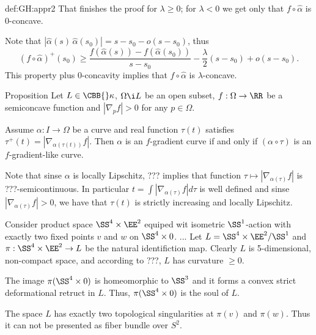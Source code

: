 {\begin{subthm}{def:GH:appr2}
That finishes the proof for $\lambda\ge 0$; for $\lambda<0$ we get only that $f\circ\hat\alpha$ is $0$-concave.

Note that $|\hat\alpha(s)\,\hat\alpha(s_0)|=s-s_0-o(s-s_0)$, thus
$$(f\circ\hat\alpha)^+(s_0)\ge
\frac{f(\hat\alpha(s))-f(\hat\alpha(s_0))}{s-s_0} -\frac\lambda2(s-s_0)+o(s-s_0).$$
This property plus $0$-concavity implies that $f\circ\hat\alpha$ is  $\lambda$-concave.\qeds  

\begin{thm}{Proposition}
Let $L\in\CBB{}\kappa$,
$\Omega\i L$ be an open subset,
$f:\Omega\to\RR$ be a semiconcave function 
and $|\nabla_p f|>0$ for any $p\in\Omega$.

Assume $\alpha:I\to\Omega$ be a curve and real function $\tau(t)$ satisfies $\tau^+(t)=|\nabla_{\alpha(\tau(t))} f|$.
Then $\alpha$ is an $f$-gradient curve
if and only if 
$(\alpha\circ\tau)$ is an $f$-gradient-like curve.
\end{thm}

Note that sinse $\alpha$ is locally Lipschitz, ??? implies that function $\tau\mapsto |\nabla_{\alpha(\tau)} f|$ is ???-semicontinuous.
In particular $t=\int|\nabla_{\alpha(\tau)} f|d\tau$ is well defined and sinse $|\nabla_{\alpha(\tau)} f|>0$, we have that $\tau(t)$ is strictly increasing and locally Lipschitz.
\qeds





















Consider product space $\SS^4\times \EE^2$ equiped wit isometric $\SS^1$-action with exactly two fixed points $v$ and $w$ on $\SS^4\times 0$.
...
Let $L=\SS^4\times \EE^2/\SS^1$ and $\pi:\SS^4\times \EE^2\to L$ be the natural identifiction map.
Clearly $L$ is 5-dimensional, non-compact space, and according to ???, $L$ has curvature $\ge0$.

The image $\pi(\SS^4\times 0)$ is homeomorphic to $\SS^3$ and it forms a convex strict deformational retruct in $L$.
Thus, $\pi(\SS^4\times 0)$ is the soul of $L$.

The space $L$ has exactly two topological singularities at $\pi(v)$ and $\pi(w)$.
Thus it can not be presented as fiber bundle over $S^2$.













\end{subthm}}
